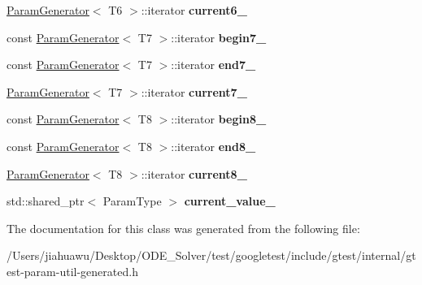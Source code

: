 \begin{DoxyCompactItemize}
\mbox{\hyperlink{classtesting_1_1internal_1_1_param_generator}{Param\+Generator}}$<$ T6 $>$\+::iterator {\bfseries current6\+\_\+}
\item 
\mbox{\label{classtesting_1_1internal_1_1_cartesian_product_generator8_1_1_iterator_aad64e4a3b21cba0ff12e6db9f2093923}} 
const \mbox{\hyperlink{classtesting_1_1internal_1_1_param_generator}{Param\+Generator}}$<$ T7 $>$\+::iterator {\bfseries begin7\+\_\+}
\item 
\mbox{\label{classtesting_1_1internal_1_1_cartesian_product_generator8_1_1_iterator_a7c62a0785a771015893a1b2e4e56aaf2}} 
const \mbox{\hyperlink{classtesting_1_1internal_1_1_param_generator}{Param\+Generator}}$<$ T7 $>$\+::iterator {\bfseries end7\+\_\+}
\item 
\mbox{\label{classtesting_1_1internal_1_1_cartesian_product_generator8_1_1_iterator_ab7d2f4adc0df24a2d1777bb7586df27d}} 
\mbox{\hyperlink{classtesting_1_1internal_1_1_param_generator}{Param\+Generator}}$<$ T7 $>$\+::iterator {\bfseries current7\+\_\+}
\item 
\mbox{\label{classtesting_1_1internal_1_1_cartesian_product_generator8_1_1_iterator_aa430573514b04b82743611976775512c}} 
const \mbox{\hyperlink{classtesting_1_1internal_1_1_param_generator}{Param\+Generator}}$<$ T8 $>$\+::iterator {\bfseries begin8\+\_\+}
\item 
\mbox{\label{classtesting_1_1internal_1_1_cartesian_product_generator8_1_1_iterator_a397dad40217eafa18c48db62181483ab}} 
const \mbox{\hyperlink{classtesting_1_1internal_1_1_param_generator}{Param\+Generator}}$<$ T8 $>$\+::iterator {\bfseries end8\+\_\+}
\item 
\mbox{\label{classtesting_1_1internal_1_1_cartesian_product_generator8_1_1_iterator_a10557c4060444c94546be5f99994be0e}} 
\mbox{\hyperlink{classtesting_1_1internal_1_1_param_generator}{Param\+Generator}}$<$ T8 $>$\+::iterator {\bfseries current8\+\_\+}
\item 
\mbox{\label{classtesting_1_1internal_1_1_cartesian_product_generator8_1_1_iterator_ab094e36b311973dd7270f9dac48a8f3f}} 
std\+::shared\+\_\+ptr$<$ Param\+Type $>$ {\bfseries current\+\_\+value\+\_\+}
\end{DoxyCompactItemize}


The documentation for this class was generated from the following file\+:\begin{DoxyCompactItemize}
\item 
/\+Users/jiahuawu/\+Desktop/\+O\+D\+E\+\_\+\+Solver/test/googletest/include/gtest/internal/gtest-\/param-\/util-\/generated.\+h\end{DoxyCompactItemize}

